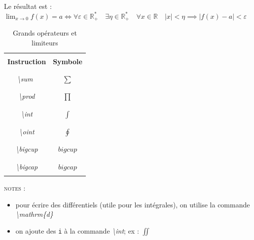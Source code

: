 \documentclass[a4paper, 10pt]{book}
\begin{document}
\vspace{0.5 cm}

Le résultat est : \\

\newcommand{\reels}{\mathbb{R}}
$ \lim_{x \to 0} f(x)= a \iff
\forall \varepsilon \in \reels^{*}_{+}\quad 
\exists \eta \in \reels^{*}_{+} \quad 
\forall x \in \reels\quad |x| < \eta \implies| f(x) - a | < \varepsilon $

\vspace{5.5 cm}

\begin{table}[ht]
    \centering
    \caption{Grands opérateurs et limiteurs}
    \vspace{0.3 cm}
    \begin{tabular}{||c|c||}
        \hline \hline \\
        \textbf{Instruction} & \textbf{Symbole} \\ \\
        \hline \\
        \textit{\textbackslash sum}\ & $ \sum $ \\ \\
        \hline \\
        \textit{\textbackslash prod} & $\prod$ \\ \\
        \hline \\
        \textit{\textbackslash int} & $\int$ \\ \\
        \hline \\
        \textit{\textbackslash oint} & $\oint$ \\ \\
        \hline \\
        \textit{\textbackslash bigcup} & $bigcup$ \\ \\
        \hline \\
        \textit{\textbackslash bigcap} & $bigcap$ \\ \\
        \hline 
    \end{tabular}
\end{table}

\textsc{notes :} \\
\begin{itemize}
    \item pour écrire des différentiels (utile pour les intégrales), on utilise la commande \textit{\textbackslash mathrm\{d\}}
    \item on ajoute des \texttt{i} à la commande \textit{\textbackslash int}; ex : $\iint$
\end{itemize} 
\end{document}
